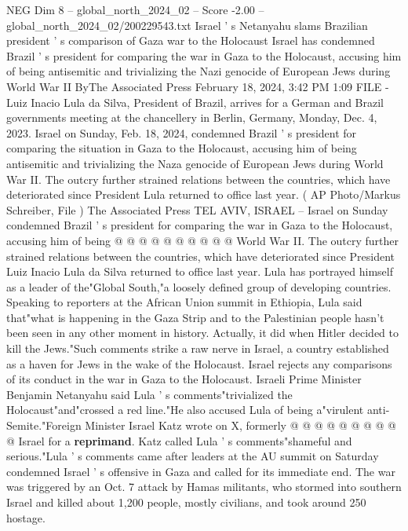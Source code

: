 \begin{textsample}{NEG Dim 8 – global\_north\_2024\_02 – Score -2.00 – global\_north\_2024\_02/200229543.txt}  \label{ex:f8_neg_229}
Israel ' s Netanyahu slams Brazilian president ' s comparison of Gaza war to the Holocaust Israel has condemned Brazil ' s president for comparing the war in Gaza to the Holocaust, accusing him of being antisemitic and trivializing the Nazi genocide of European Jews during World War II ByThe Associated Press February 18, 2024, 3:42 PM 1:09 FILE - Luiz Inacio Lula da Silva, President of Brazil, arrives for a German and Brazil governments meeting at the chancellery in Berlin, Germany, Monday, Dec. 4, 2023.
Israel on Sunday, Feb. 18, 2024, condemned Brazil ' s president for comparing the situation in Gaza to the Holocaust, accusing him of being antisemitic and trivializing the Naza genocide of European Jews during World War II.
The outcry further strained relations between the countries, which have deteriorated since President Lula returned to office last year. ( AP Photo/Markus Schreiber, File ) The Associated Press TEL AVIV, ISRAEL -- Israel on Sunday condemned Brazil ' s president for comparing the war in Gaza to the Holocaust, accusing him of being @ @ @ @ @ @ @ @ @ @ World War II.
The outcry further strained relations between the countries, which have deteriorated since President Luiz Inacio Lula da Silva returned to office last year.
Lula has portrayed himself as a leader of the"Global South,"a loosely defined group of developing countries.
Speaking to reporters at the African Union summit in Ethiopia, Lula said that"what is happening in the Gaza Strip and to the Palestinian people hasn't been seen in any other moment in history.
Actually, it did when Hitler decided to kill the Jews."Such comments strike a raw nerve in Israel, a country established as a haven for Jews in the wake of the Holocaust.
Israel rejects any comparisons of its conduct in the war in Gaza to the Holocaust.
Israeli Prime Minister Benjamin Netanyahu said Lula ' s comments"trivialized the Holocaust"and"crossed a red line."He also accused Lula of being a"virulent anti-Semite."Foreign Minister Israel Katz wrote on X, formerly @ @ @ @ @ @ @ @ @ @ Israel for a \textbf{reprimand}.
Katz called Lula ' s comments"shameful and serious."Lula ' s comments came after leaders at the AU summit on Saturday condemned Israel ' s offensive in Gaza and called for its immediate end.
The war was triggered by an Oct. 7 attack by Hamas militants, who stormed into southern Israel and killed about 1,200 people, mostly civilians, and took around 250 hostage.

\end{textsample}
